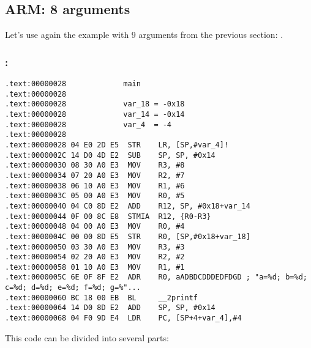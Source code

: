 \subsection{ARM: 8 arguments}

Let's use again the example with 9 arguments from the previous section: .



\subsubsection{\OptimizingKeilVI: \ARMMode}

\begin{lstlisting}
.text:00000028             main
.text:00000028
.text:00000028             var_18 = -0x18
.text:00000028             var_14 = -0x14
.text:00000028             var_4  = -4
.text:00000028
.text:00000028 04 E0 2D E5  STR    LR, [SP,#var_4]!
.text:0000002C 14 D0 4D E2  SUB    SP, SP, #0x14
.text:00000030 08 30 A0 E3  MOV    R3, #8
.text:00000034 07 20 A0 E3  MOV    R2, #7
.text:00000038 06 10 A0 E3  MOV    R1, #6
.text:0000003C 05 00 A0 E3  MOV    R0, #5
.text:00000040 04 C0 8D E2  ADD    R12, SP, #0x18+var_14
.text:00000044 0F 00 8C E8  STMIA  R12, {R0-R3}
.text:00000048 04 00 A0 E3  MOV    R0, #4
.text:0000004C 00 00 8D E5  STR    R0, [SP,#0x18+var_18]
.text:00000050 03 30 A0 E3  MOV    R3, #3
.text:00000054 02 20 A0 E3  MOV    R2, #2
.text:00000058 01 10 A0 E3  MOV    R1, #1
.text:0000005C 6E 0F 8F E2  ADR    R0, aADBDCDDDEDFDGD ; "a=%d; b=%d; c=%d; d=%d; e=%d; f=%d; g=%"...
.text:00000060 BC 18 00 EB  BL     __2printf
.text:00000064 14 D0 8D E2  ADD    SP, SP, #0x14
.text:00000068 04 F0 9D E4  LDR    PC, [SP+4+var_4],#4
\end{lstlisting}

This code can be divided into several parts:

